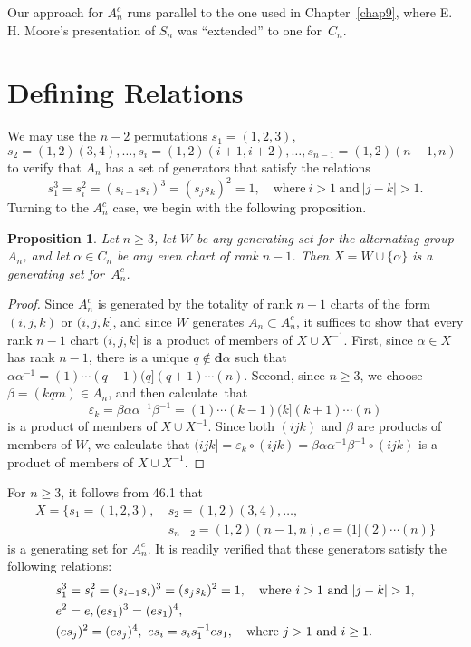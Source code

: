 \documentclass{surv-l}
\numberwithin{equation}{section}
\numberwithin{table}{section}
\numberwithin{figure}{section}
\theoremstyle{plain}
\newtheorem{proposition}[equation]{Proposition}
\theoremstyle{definition}
\begin{document}
Our approach for $A_{n}^{c}$ runs parallel to the one used in
Chapter~\ref{chap9}, where E. H. Moore's presentation of $S_{n}$
was ``extended'' to one for~$C_{n}$.

\setcounter{section}{45}

\section{Defining Relations}\label{sec10.46}

We may use the $n-2$ permutations $s_{1}=(1,2,3)$,
$s_{2}=(1,2)(3,4),\ldots, s_{i}=(1,2)(i+1, i+2),\ldots,
s_{n-1}=(1,2)(n-1, n)$ to verify that $A_{n}$ has a set of
generators that satisfy the relations
\[
s_{1}^{3}=s_{i}^{2}=(s_{i-1}s_{i})^{3}=(s_{j}s_{k})^{2}=1,\quad \mathrm{where}\
i>1\ \mathrm{and}\ |j-k|>1.
\]
Turning to the $A_{n}^{c}$ case, we begin with the following
proposition.

\begin{proposition}\label{prop10.46.1}
Let $n \geq 3$, let $W$ be any generating set for the alternating
group $A_{n}$, and let $\alpha\in C_{n}$ be any even chart of rank
$n-1$. Then $X=W\cup\{\alpha\}$ is a generating set
for~$A_{n}^{c}$.
\end{proposition}

\begin{proof} Since $A_{n}^{c}$ is generated by the totality of rank $n-1$
charts of the form $(i,j, k)$ or $(i,j, k]$, and since $W$
generates $A_{n}\subset A_{n}^{c}$, it suffices to show that every
rank $n-1$ chart $(i,j,k]$ is a product of members of $X\cup
X^{-1}$. First, since $\alpha\in X$ has rank $n-1$, there is a
unique $q\not\in \mathbf{d}\alpha$ such that
$\alpha\alpha^{-1}=(1)\cdots(q-1)(q](q+1)\cdots(n)$. Second, since
$n\geq 3$, we choose $\beta=(kqm)\in A_{n}$, and then
calculate~that
\[
\varepsilon_{k}=\beta\alpha\alpha^{-1}\beta^{-1}=(1)\cdots(k-1)(k](k+1)\cdots(n)
\]
is a product of members of $X\cup X^{-1}$. Since both $(ijk)$ and
$\beta$ are products of members of $W$, we calculate that
$(ijk]=\varepsilon_{k}\circ
(ijk)=\beta\alpha\alpha^{-1}\beta^{-1}\circ (ijk)$ is a product of
members of $X\cup X^{-1}.$
\end{proof}

For $n \geq 3$, it follows from 46.1 that
\begin{align*}
X=\{s_{1}=(1,2,3),\ &s_{2}=(1,2)(3,4),\ldots, \\
&s_{n-2} =(1,2)(n-1, n), e=(1](2)\cdots(n)\}
\end{align*}
is a generating set for $A_{n}^{c}$. It is readily verified that
these generators satisfy the following relations:
\begin{align}
&s_{1}^{3} =s_{i}^{2}=(s_{i-1}s_{i})^{3}=(s_{j}s_{k})^{2}=1,\quad \mathrm{where}\
i>1\ \mathrm{and}\ |j-k|>1, \notag \\
& e^{2} =e, (es_{1})^{3}=(es_{1})^{4}, \label{eq10.46.2} \\
&(es_{j})^{2}=(es_{j})^{4},\ es_{i}=s_{i}s_{1}^{-1}es_{1},\quad \mathrm{where}\
j>1\ \mathrm{and}\ i\geq 1. \notag
\end{align}
\end{document}
